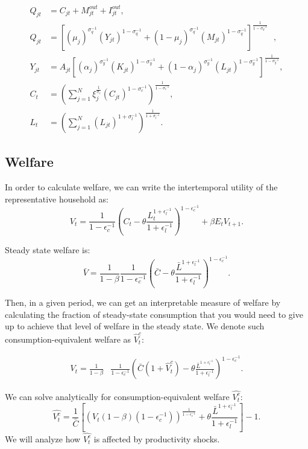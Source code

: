 {\begin{align*}
Q_{jt} & =C_{jt}+M_{jt}^{out}+I_{jt}^{out},\\
Q_{jt} & =\left[(\mu_{j})^{\sigma_{q}^{-1}}\left(Y_{jt}\right)^{1-\sigma_{q}^{-1}}+\left(1-\mu_{j}\right)^{\sigma_{q}^{-1}}\left(M_{jt}\right)^{1-\sigma_{q}^{-1}}\right]^{\frac{1}{1-\sigma_{q}^{-1}}}\text{ },\\
Y_{jt} & =A_{jt}\left[(\alpha_{j})^{\sigma_{y}^{-1}}\left(K_{jt}\right)^{1-\sigma_{y}^{-1}}+\left(1-\alpha_{j}\right)^{\sigma_{y}^{-1}}\left(L_{jt}\right)^{1-\sigma_{y}^{-1}}\right]^{\frac{1}{1-\sigma_{y}^{-1}}},\\
C_{t} & =\left(\sum_{j=1}^{N}\xi_{j}^{\frac{{1}}{\sigma_{c}}}(C_{jt})^{1-\sigma_{c}^{-1}}\right)^{\frac{1}{1-\sigma_{c}^{-1}}},\\
L_{t} & =\left(\sum_{j=1}^{N}(L_{jt})^{1+\sigma_{l}^{-1}}\right)^{\frac{1}{1+\sigma_{l}^{-1}}}.
\end{align*}
}


\subsection{Welfare } \label{subsec:Welfare}

In order to calculate welfare, we can write the intertemporal utility
of the representative household as:
\[
V_{t}=\frac{1}{1-\epsilon_{c}^{-1}}\left(C_{t}-\theta\frac{L_{t}^{1+\epsilon_{l}^{-1}}}{1+\epsilon_{l}^{-1}}\right)^{1-\epsilon_{c}^{-1}}+\beta  E_{t} V_{t+1}.
\]

Steady state welfare is:
\[
\bar{{V}}=\frac{1}{1-\beta}\frac{1}{1-\epsilon_{c}^{-1}}\left(\bar{{C}}-\theta\frac{\bar{{L}}^{1+\epsilon_{l}^{-1}}}{1+\epsilon_{l}^{-1}}\right)^{1-\epsilon_{c}^{-1}}.
\]

Then, in a given period, we can get an interpretable measure of welfare
by calculating the fraction of steady-state consumption that you would
need to give up to achieve that level of welfare in the steady
state. We denote such consumption-equivalent welfare as $\hat{V}_{t}^{c}$:

\begin{align*}
V_{t}=\frac{1}{1-\beta} & \frac{1}{1-\epsilon_{c}^{-1}}\left(\bar{{C}}(1+\hat{{V}}_{t}^{c})-\theta\frac{\bar{{L}}^{1+\epsilon_{l}^{-1}}}{1+\epsilon_{l}^{-1}}\right)^{1-\epsilon_{c}^{-1}}.
\end{align*}

We can solve analytically for consumption-equivalent welfare $\hat{{V}_{t}^{c}}$:
\[
\hat{{V}_{t}^{c}}=\frac{1}{\bar{{C}}}\left[\left(V_{t}(1-\beta)(1-\epsilon_{c}^{-1})\right)^{\frac{1}{1-\epsilon_{c}^{-1}}}+\theta\frac{\bar{{L}}^{1+\epsilon_{l}^{-1}}}{1+\epsilon_{l}^{-1}}\right]-1.
\]
We will analyze how $\hat{{V}_{t}^{c}}$ is affected by productivity
shocks.

